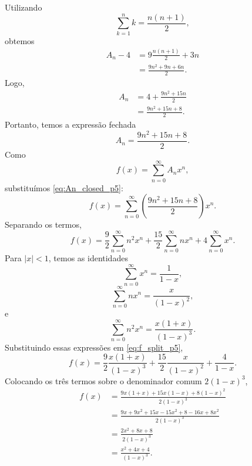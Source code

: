\documentclass[11pt,a4paper]{article}
\begin{document}
%
Utilizando
%
\begin{equation}
    \sum_{k=1}^{n}k=\frac{n(n+1)}{2},
\end{equation}
%
obtemos
%
\begin{align}
    A_n-4
    &=
    9\frac{n(n+1)}{2}+3n
    \nonumber\\
    &=
    \frac{9n^2+9n+6n}{2}.
\end{align}
%
Logo,
%
\begin{align}
    A_n
    &=
    4+\frac{9n^2+15n}{2}
    \nonumber\\
    &=
    \frac{9n^2+15n+8}{2}.
\end{align}
%
Portanto, temos a expressão fechada
%
\begin{equation}
    A_n=\frac{9n^2+15n+8}{2}.
    \label{eq:An_closed_p5}
\end{equation}
%
Como
%
\begin{equation}
    f(x)
    =
    \sum_{n=0}^{\infty}A_nx^n,
\end{equation}
%
substituímos \eqref{eq:An_closed_p5}:
%
\begin{equation}
    f(x)
    =
    \sum_{n=0}^{\infty}
    \left(
        \frac{9n^2+15n+8}{2}
    \right)x^n.
\end{equation}
%
Separando os termos,
%
\begin{equation}
    f(x)
    =
    \frac{9}{2}\sum_{n=0}^{\infty}n^2x^n
    +
    \frac{15}{2}\sum_{n=0}^{\infty}nx^n
    +
    4\sum_{n=0}^{\infty}x^n.
    \label{eq:f_split_p5}
\end{equation}
%
Para $|x|<1$, temos as identidades
%
\begin{equation}
    \sum_{n=0}^{\infty}x^n
    =
    \frac{1}{1-x},
    \label{eq:sum0_p5}
\end{equation}
%
\begin{equation}
    \sum_{n=0}^{\infty}nx^n
    =
    \frac{x}{(1-x)^2},
    \label{eq:sum1_p5}
\end{equation}
%
e
%
\begin{equation}
    \sum_{n=0}^{\infty}n^2x^n
    =
    \frac{x(1+x)}{(1-x)^3}.
    \label{eq:sum2_p5}
\end{equation}
%
Substituindo essas expressões em \eqref{eq:f_split_p5},
%
\begin{equation}
    f(x)
    =
    \frac{9}{2}
    \frac{x(1+x)}{(1-x)^3}
    +
    \frac{15}{2}
    \frac{x}{(1-x)^2}
    +
    \frac{4}{1-x}.
\end{equation}
%
Colocando os três termos sobre o denominador comum $2(1-x)^3$,
%
\begin{align}
    f(x)
    &=
    \frac{
        9x(1+x)
        +
        15x(1-x)
        +
        8(1-x)^2
    }
    {2(1-x)^3}
    \nonumber\\
    &=
    \frac{
        9x+9x^2
        +
        15x-15x^2
        +
        8-16x+8x^2
    }
    {2(1-x)^3}
    \nonumber\\
    &=
    \frac{
        2x^2+8x+8
    }
    {2(1-x)^3}
    \nonumber\\
    &=
    \frac{
        x^2+4x+4
    }
    {(1-x)^3}.
\end{align}
\end{document}
